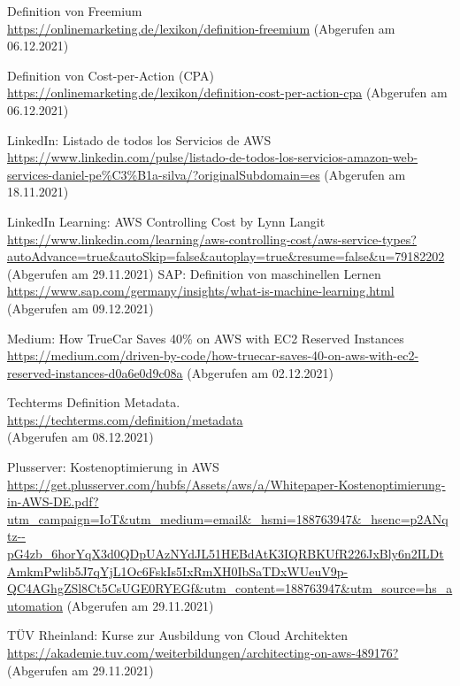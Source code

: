 \begin{thebibliography}{HR08}
  Definition von Freemium\\
 \url{https://onlinemarketing.de/lexikon/definition-freemium}
 (Abgerufen am 06.12.2021)
  
  Definition von Cost-per-Action (CPA)\\
 \url{https://onlinemarketing.de/lexikon/definition-cost-per-action-cpa}
 (Abgerufen am 06.12.2021)
 
  LinkedIn: Listado de todos los Servicios de AWS\\
 \url{https://www.linkedin.com/pulse/listado-de-todos-los-servicios-amazon-web-services-daniel-pe%C3%B1a-silva/?originalSubdomain=es}
 (Abgerufen am 18.11.2021)

  LinkedIn Learning: AWS Controlling Cost by Lynn Langit\\
 \url{https://www.linkedin.com/learning/aws-controlling-cost/aws-service-types?autoAdvance=true&autoSkip=false&autoplay=true&resume=false&u=79182202}
 (Abgerufen am 29.11.2021)
 SAP: Definition von maschinellen Lernen\\
 \url{https://www.sap.com/germany/insights/what-is-machine-learning.html}
 (Abgerufen am 09.12.2021)

 Medium: How TrueCar Saves 40\% on AWS with EC2 Reserved Instances\\
 \url{https://medium.com/driven-by-code/how-truecar-saves-40-on-aws-with-ec2-reserved-instances-d0a6e0d9c08a}
 (Abgerufen am 02.12.2021)
 
  Techterms Definition Metadata.\\
 \url{https://techterms.com/definition/metadata}\\
 (Abgerufen am 08.12.2021)

  Plusserver: Kostenoptimierung in AWS\\
 \url{https://get.plusserver.com/hubfs/Assets/aws/a/Whitepaper-Kostenoptimierung-in-AWS-DE.pdf?utm_campaign=IoT&utm_medium=email&_hsmi=188763947&_hsenc=p2ANqtz--pG4zb_6horYqX3d0QDpUAzNYdJL51HEBdAtK3IQRBKUfR226JxBly6n2ILDtAmkmPwlib5J7qYjL1Oc6FskIs5IxRmXH0IbSaTDxWUeuV9p-QC4AGhgZSl8Ct5CsUGE0RYEGf&utm_content=188763947&utm_source=hs_automation}
 (Abgerufen am 29.11.2021)
 
  TÜV Rheinland: Kurse zur Ausbildung von Cloud Architekten\\
 \url{https://akademie.tuv.com/weiterbildungen/architecting-on-aws-489176?}
 (Abgerufen am 29.11.2021)


\end{thebibliography}
